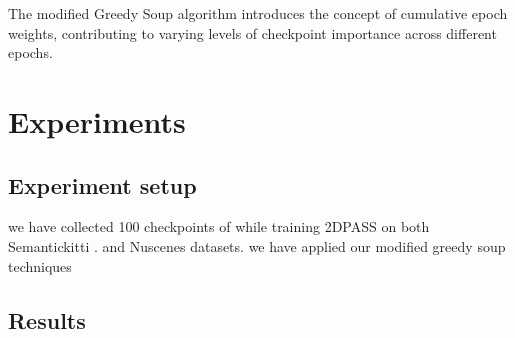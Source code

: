 \documentclass[10pt,twocolumn,letterpaper]{article}
\begin{document}
The modified Greedy Soup algorithm introduces the concept of cumulative epoch weights, contributing to varying levels of checkpoint importance across different epochs.


\section{Experiments}
\subsection{Experiment setup}
we have collected 100 checkpoints of while training 2DPASS \cite{yan20222dpass} on both  Semantickitti \cite{behley2019semantickitti}. and Nuscenes \cite{caesar2020nuscenes}  datasets.
we have applied our modified greedy soup techniques 

\subsection{Results}
\end{document}
